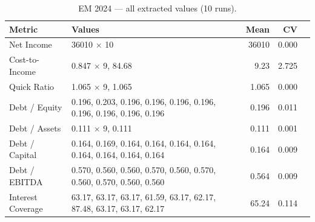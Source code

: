 \documentclass[12pt, a4paper]{article}
\newcommand{\cmark}{\textcolor{green!60!black}{\ding{51}}}  %
\newcommand{\xmark}{\textcolor{red!70!black}{\ding{55}}}    %
\begin{document}
\begin{table}[H]
\centering\small
\caption{EM 2024 --- all extracted values (10 runs).}
\label{tab:em-raw}
\begin{tabular}{lp{8.5cm}rrc}
\toprule
\textbf{Metric} & \textbf{Values} & \textbf{Mean} & \textbf{CV} & \\
\midrule
Net Income         & 36010 $\times$ 10                                                 & 36010 & 0.000 & \cmark \\
Cost-to-Income     & 0.847 $\times$ 9, 84.68                                           &  9.23 & 2.725 & \xmark \\
Quick Ratio        & 1.065 $\times$ 9, 1.065                                           & 1.065 & 0.000 & \cmark \\
Debt / Equity      & 0.196, 0.203, 0.196, 0.196, 0.196, 0.196, 0.196, 0.196, 0.196, 0.196 & 0.196 & 0.011 & \cmark \\
Debt / Assets      & 0.111 $\times$ 9, 0.111                                           & 0.111 & 0.001 & \cmark \\
Debt / Capital     & 0.164, 0.169, 0.164, 0.164, 0.164, 0.164, 0.164, 0.164, 0.164, 0.164 & 0.164 & 0.009 & \cmark \\
Debt / EBITDA      & 0.570, 0.560, 0.560, 0.570, 0.560, 0.570, 0.560, 0.570, 0.560, 0.560 & 0.564 & 0.009 & \cmark \\
Interest Coverage  & 63.17, 63.17, 63.17, 61.59, 63.17, 62.17, 87.48, 63.17, 63.17, 62.17 & 65.24 & 0.114 & \xmark \\
\bottomrule
\end{tabular}
\end{table}
\end{document}
